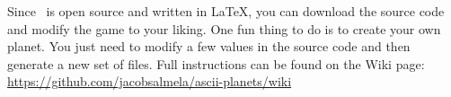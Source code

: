 Since \asciiplanets\ is open source and written in LaTeX, you can download the 
source code and modify the game to your liking.
\newline\newline
One fun thing to do is to create your own planet.  You just need to modify a few
 values in the source code and then generate a new set of files.  Full 
 instructions can be found on the Wiki page: 
 \url{https://github.com/jacobsalmela/ascii-planets/wiki}
